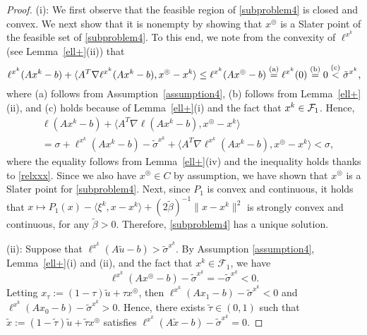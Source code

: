 \documentclass[10pt]{article}
\numberwithin{equation}{section}
\def\xfeasss{x^\circledcirc}
\begin{document}
\begin{proof}
(i): We first observe that the feasible region of \eqref{subproblem4} is  closed and convex. We next show that it is nonempty by showing that $\xfeasss$ is a Slater point of the feasible set of \eqref{subproblem4}.
To this end, we note from the convexity of $\ell^{x^k}$ (see Lemma~\ref{ell+}(ii)) that
\begin{equation}\label{relxxx}
\ell^{x^k}(Ax^k - b) + \langle A^T\nabla\ell^{x^k}(Ax^k - b), \xfeasss - x^k\rangle\leq\ell^{x^k}(A\xfeasss - b) \overset{\rm (a)}= \ell^{x^k}(0) \overset{\rm (b)}= 0 \overset{\rm (c)}< \tilde{\sigma}^{x^k},
\end{equation}
where (a) follows from Assumption~\ref{assumption4}, (b) follows from Lemma~\ref{ell+}(ii), and (c) holds because of Lemma~\ref{ell+}(i) and the fact that $x^k\in {\cal F}_1$. Hence,
\[
\begin{aligned}
  &\ell(Ax^k - b) + \langle A^T\nabla\ell(Ax^k - b), \xfeasss - x^k\rangle\\
  & = \sigma + \ell^{x^k}(Ax^k - b)- \tilde{\sigma}^{x^k} + \langle A^T\nabla\ell^{x^k}(Ax^k - b), \xfeasss - x^k\rangle < \sigma,
\end{aligned}
\]
where the equality follows from Lemma~\ref{ell+}(iv) and the inequality holds thanks to \eqref{relxxx}.
Since we also have $\xfeasss\in C$ by assumption, we have shown that $\xfeasss$ is a Slater point for \eqref{subproblem4}. Next, since $P_1$ is convex and continuous, it holds that $x\mapsto P_1(x) - \langle \xi^k, x - x^k\rangle + (2\widetilde{\beta})^{-1}\|x - x^k\|^2$ is strongly convex and continuous, for any $\widetilde{\beta} > 0$. Therefore, \eqref{subproblem4} has a unique solution.

(ii): Suppose that $\ell^{x^k}(A\widetilde{u} - b) > \tilde{\sigma}^{x^k}$. By Assumption \ref{assumption4}, Lemma~\ref{ell+}(i) and (ii), and the fact that $x^k\in\mathcal{F}_1$, we have
\begin{equation}\label{circstrictineq}
\ell^{x^k}(A\xfeasss - b) - \tilde{\sigma}^{x^k} = -\tilde{\sigma}^{x^k} < 0.
\end{equation}
Letting $x_{\tau}:=(1 - \tau)\widetilde{u} + \tau \xfeasss$, then $\ell^{x^k}(Ax_{1} - b) - \tilde{\sigma}^{x^k} <0$ and $\ell^{x^k}(Ax_{0} - b) - \tilde{\sigma}^{x^k} >0$. Hence, there exists $\widetilde{\tau}\in (0, 1)$ such that $\widetilde{x} := (1 - \widetilde{\tau})\widetilde{u} + \widetilde{\tau} \xfeasss$ satisfies $\ell^{x^k}(A\widetilde{x} - b) - \tilde{\sigma}^{x^k} = 0$.


\end{proof}
\end{document}
